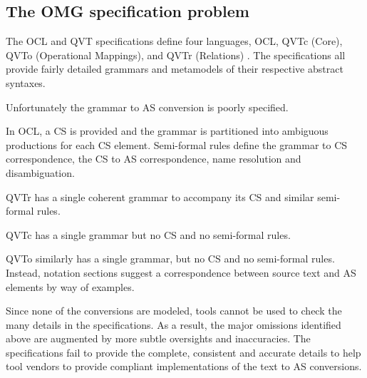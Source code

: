 \documentclass{llncs}
\begin{document}

\subsection{The OMG specification problem}

The OCL \cite{omg2013ocl} and QVT \cite{omg2014qvt} specifications define four languages, OCL, QVTc (Core), QVTo (Operational Mappings), and QVTr (Relations)%
. The specifications all provide fairly detailed grammars and metamodels of their respective abstract syntaxes.

Unfortunately the grammar to AS conversion is poorly specified.

In OCL, a CS is provided and the grammar is partitioned into ambiguous productions for each CS element. Semi-formal rules define the grammar to CS correspondence, the CS to AS correspondence, name resolution and disambiguation.

QVTr has a single coherent grammar to accompany its CS and similar semi-formal rules.

QVTc has a single grammar but no CS and no semi-formal rules.

QVTo similarly has a single grammar, but no CS and no semi-formal rules. Instead, notation sections suggest a correspondence between source text and AS elements by way of examples. 

Since none of the conversions are modeled, tools cannot be used to check the many details in the specifications. As a result, the major omissions identified above are augmented by more subtle oversights and inaccuracies. The specifications fail to provide the complete, consistent and accurate details to help tool vendors to provide compliant implementations of the text to AS conversions. 

\end{document}
